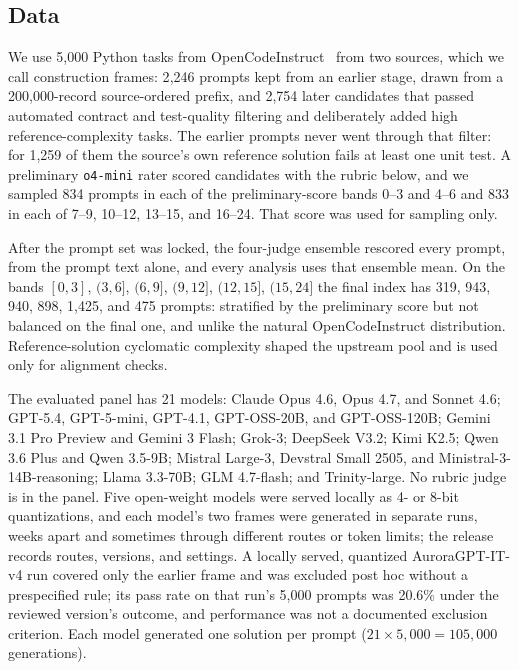 \documentclass{article}
\begin{document}
\subsection{Data}\label{sec:data}
We use 5{,}000 Python tasks from OpenCodeInstruct~\cite{opencodeinst} from two sources, which we call construction frames: 2{,}246 prompts kept from an earlier stage, drawn from a 200{,}000-record source-ordered prefix, and 2{,}754 later candidates that passed automated contract and test-quality filtering and deliberately added high reference-complexity tasks. The earlier prompts never went through that filter: for 1{,}259 of them the source's own reference solution fails at least one unit test. A preliminary \texttt{o4-mini} rater scored candidates with the rubric below, and we sampled 834 prompts in each of the preliminary-score bands 0--3 and 4--6 and 833 in each of 7--9, 10--12, 13--15, and 16--24. That score was used for sampling only.

After the prompt set was locked, the four-judge ensemble rescored every prompt, from the prompt text alone, and every analysis uses that ensemble mean. On the bands $[0,3]$, $(3,6]$, $(6,9]$, $(9,12]$, $(12,15]$, $(15,24]$ the final index has 319, 943, 940, 898, 1{,}425, and 475 prompts: stratified by the preliminary score but not balanced on the final one, and unlike the natural OpenCodeInstruct distribution. Reference-solution cyclomatic complexity shaped the upstream pool and is used only for alignment checks.

The evaluated panel has 21 models: Claude Opus 4.6, Opus 4.7, and Sonnet 4.6; GPT-5.4, GPT-5-mini, GPT-4.1, GPT-OSS-20B, and GPT-OSS-120B; Gemini 3.1 Pro Preview and Gemini 3 Flash; Grok-3; DeepSeek V3.2; Kimi K2.5; Qwen 3.6 Plus and Qwen 3.5-9B; Mistral Large-3, Devstral Small 2505, and Ministral-3-14B-reasoning; Llama 3.3-70B; GLM 4.7-flash; and Trinity-large. No rubric judge is in the panel. Five open-weight models were served locally as 4- or 8-bit quantizations, and each model's two frames were generated in separate runs, weeks apart and sometimes through different routes or token limits; the release records routes, versions, and settings. A locally served, quantized AuroraGPT-IT-v4 run covered only the earlier frame and was excluded post hoc without a prespecified rule; its pass rate on that run's 5{,}000 prompts was 20.6\% under the reviewed version's outcome, and performance was not a documented exclusion criterion. Each model generated one solution per prompt ($21\times5{,}000=105{,}000$ generations).
\end{document}
